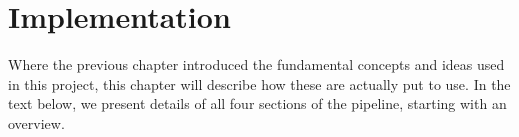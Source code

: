 \chapter{Implementation}
\label{chapter:Implementation}	
Where the previous chapter introduced the fundamental concepts and ideas used in this project, this chapter will describe how these are actually put to use. In the text below, we present details of all four sections of the pipeline, starting with an overview. 















